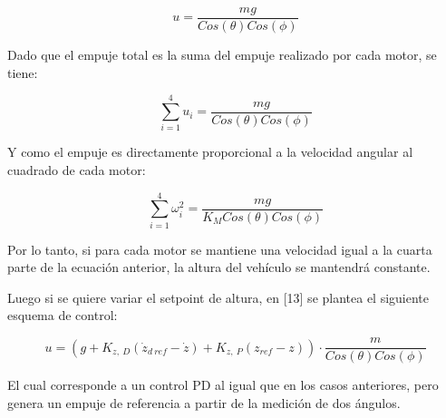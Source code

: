 \documentclass[../main.tex]{subfiles}
\begin{document}
\[
u=\frac{mg}{Cos(\theta)Cos(\phi)}
\]

Dado que el empuje total es la suma del empuje realizado por cada
motor, se tiene:

\[
\sum_{i=1}^{4}u_{i}=\frac{mg}{Cos(\theta)Cos(\phi)}
\]

Y como el empuje es directamente proporcional a la velocidad angular
al cuadrado de cada motor:

\[
\sum_{i=1}^{4}\omega_{i}^{2}=\frac{mg}{K_{M}Cos(\theta)Cos(\phi)}
\]

Por lo tanto, si para cada motor se mantiene una velocidad igual a
la cuarta parte de la ecuación anterior, la altura del vehículo se
mantendrá constante. 

Luego si se quiere variar el setpoint de altura, en [13] se plantea
el siguiente esquema de control:

\[
u=(g+K_{z,\ D}(\dot{z}_{d\ ref}-\dot{z})+K_{z,\ P}(z_{ref}-z))\cdot\frac{m}{Cos(\theta)Cos(\phi)}
\]

El cual corresponde a un control PD al igual que en los casos anteriores,
pero genera un empuje de referencia a partir de la medición de dos
ángulos.
\end{document}
